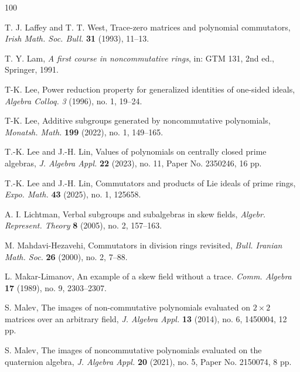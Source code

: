 \documentclass[11pt]{article}
\theoremstyle{definition}
\begin{document}
{{{{\begin{thebibliography}{100}
					
					
					
					  T. J. Laffey and T. T. West, Trace-zero matrices and polynomial commutators, \textit{Irish Math. Soc. Bull.} \textbf{31} (1993), 11--13.	
					
					 T. Y. Lam, \textit{A first course in noncommutative rings}, in: GTM 131, 2nd ed., Springer, 1991.

                   	T-K. Lee, Power reduction property for generalized identities of one-sided ideals,  \textit{Algebra Colloq.} \textit{3} (1996), no. 1, 19--24.
					
						T-K. Lee,
					Additive subgroups generated by noncommutative polynomials,
					\textit{Monatsh. Math.} \textbf{199} (2022), no. 1, 149--165.
					
						T.-K. Lee and J.-H. Lin,
					Values of polynomials on centrally closed prime algebras,	\textit{J. Algebra Appl.} \textbf{22} (2023), no. 11, Paper No. 2350246, 16 pp.
					
					 T.-K. Lee and J.-H. Lin,  Commutators and products of Lie ideals of prime rings,
					\textit{Expo. Math.} {\bf 43} (2025), no. 1, 125658.
										
					
					 A. I. Lichtman,
					Verbal subgroups and subalgebras in skew fields,
					\textit{Algebr. Represent. Theory} \textbf{8} (2005), no. 2, 157--163.
					
					
					
					
					 M. Mahdavi-Hezavehi, Commutators in division rings revisited, \textit{Bull. Iranian Math. Soc.} \textbf{26} (2000), no. 2, 7–88.
					
					 L. Makar-Limanov,
					An example of a skew field without a trace.
					\textit{Comm. Algebra} \textbf{17} (1989), no. 9, 2303--2307.
					
					 S. Malev, The images of non-commutative polynomials evaluated on $2\times2$ matrices over an arbitrary field, \textit{J. Algebra Appl.} \textbf{13} (2014), no. 6, 1450004, 12 pp.
					
					 S. Malev,
					The images of noncommutative polynomials evaluated on the quaternion algebra,
					\textit{J. Algebra Appl.} \textbf{20} (2021), no. 5, Paper No. 2150074, 8 pp.
					

\end{thebibliography}}}}}
\end{document}
